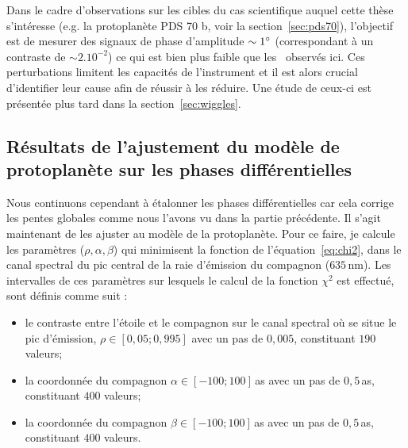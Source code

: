 Dans le cadre d'observations sur les cibles du cas scientifique auquel cette thèse s'intéresse (e.g. la protoplanète PDS 70 b, voir la section~\ref{sec:pds70}), l'objectif est de mesurer des signaux de phase d'amplitude $\sim 1^{\circ}$ (correspondant à un contraste de $\sim 2.10^{-2}$) ce qui est bien plus faible que les \wiggles~observés ici. Ces perturbations limitent les capacités de l'instrument et il est alors crucial d'identifier leur cause afin de réussir à les réduire. Une étude de ceux-ci est présentée plus tard dans la section~\ref{sec:wiggles}.


\subsection{Résultats de l'ajustement du modèle de protoplanète sur les phases différentielles}

Nous continuons cependant à étalonner les phases différentielles car cela corrige les pentes globales comme nous l'avons vu dans la partie précédente. Il s'agit maintenant de les ajuster au modèle de la protoplanète. Pour ce faire, je calcule les paramètres ($\rho, \alpha, \beta$) qui minimisent la fonction de l'équation~\ref{eq:chi2}, dans le canal spectral du pic central de la raie d'émission du compagnon ($635 \,$nm). Les intervalles de ces paramètres sur lesquels le calcul de la fonction $\chi^2$ est effectué, sont définis comme suit :

\begin{itemize}
    \item le contraste entre l'étoile et le compagnon sur le canal spectral où se situe le pic d'émission, $\rho \in [0,05; 0,995]$ avec un pas de $0,005$, constituant $190$ valeurs;
    \item la coordonnée du compagnon $\alpha \in [-100; 100]\,$as avec un pas de $0,5 \,$as, constituant $400$ valeurs;
    \item la coordonnée du compagnon $\beta \in [-100; 100]\,$as avec un pas de $0,5 \,$as, constituant $400$ valeurs.
\end{itemize}

